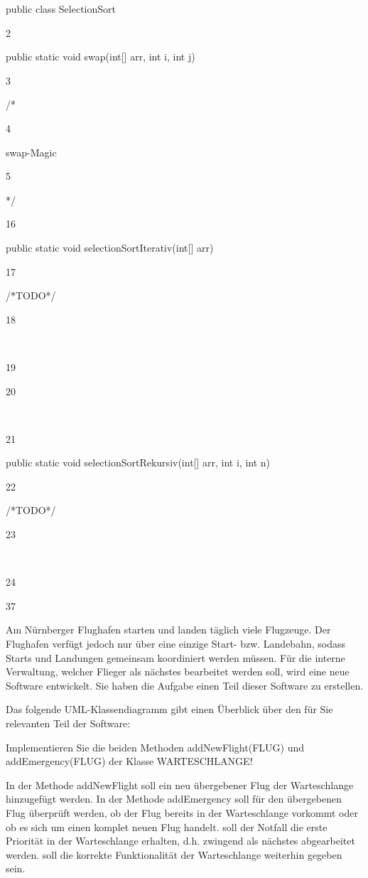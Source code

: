 \documentclass{lehramt-informatik-haupt}
\begin{document}
public class SelectionSort{

2

    public static void swap(int[] arr, int i, int j){

3

        /*

4

         swap-Magic

5

        */

16

    public static void selectionSortIterativ(int[] arr){

17

        /*TODO*/

18

​

19

    }

20

​

21

    public static void selectionSortRekursiv(int[] arr, int i, int n){

22

        /*TODO*/

23

​

24

    }

37

}

Am Nürnberger Flughafen starten und landen täglich viele Flugzeuge. Der Flughafen verfügt jedoch nur über eine einzige Start- bzw. Landebahn, sodass Starts und Landungen gemeinsam koordiniert werden müssen. Für die interne Verwaltung, welcher Flieger als nächstes bearbeitet werden soll, wird eine neue Software entwickelt. Sie haben die Aufgabe einen Teil dieser Software zu erstellen.

Das folgende UML-Klassendiagramm gibt einen Überblick über den für Sie relevanten Teil der Software:

Implementieren Sie die beiden Methoden addNewFlight(FLUG) und addEmergency(FLUG) der Klasse WARTESCHLANGE!

    In der Methode addNewFlight
        soll ein neu übergebener Flug der Warteschlange hinzugefügt werden.
    In der Methode addEmergency
        soll für den übergebenen Flug überprüft werden, ob der Flug bereits in der Warteschlange vorkommt oder ob es sich um einen komplet neuen Flug handelt.
        soll der Notfall die erste Priorität in der Warteschlange erhalten, d.h. zwingend als nächstes abgearbeitet werden.
        soll die korrekte Funktionalität der Warteschlange weiterhin gegeben sein.

}
\end{document}
